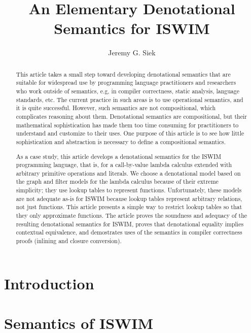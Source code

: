 \documentclass{article}
\title{An Elementary Denotational \\ Semantics for ISWIM}
\author{Jeremy G. Siek}
\begin{document}
\maketitle

\begin{abstract}
  This article takes a small step toward developing denotational
  semantics that are suitable for widespread use by programming
  language practitioners and researchers who work outside of
  semantics, e.g, in compiler correctness, static analysis, language
  standards, etc. The current practice in such areas is to use
  operational semantics, and it is quite successful. However, such
  semantics are not compositional, which complicates reasoning about
  them.  Denotational semantics are compositional, but their
  mathematical sophistication has made them too time consuming for
  practitioners to understand and customize to their uses. One purpose
  of this article is to see how little sophistication and abstraction
  is necessary to define a compositional semantics.

  As a case study, this article develops a denotational semantics for
  the ISWIM programming language, that is, for a call-by-value lambda
  calculus extended with arbitrary primitive operations and literals.
  We choose a denotational model based on the graph and filter models
  for the lambda calculus because of their extreme simplicity; they
  use lookup tables to represent functions. Unfortunately, these
  models are not adequate as-is for ISWIM because lookup tables
  represent arbitrary relations, not just functions. This article
  presents a simple way to restrict lookup tables so that they only
  approximate functions. The article proves the soundness and adequacy
  of the resulting denotational semantics for ISWIM, proves that
  denotational equality implies contextual equivalence, and
  demostrates uses of the semantics in compiler correctness proofs
  (inlining and closure conversion).
\end{abstract}


\section{Introduction}

\citet{Barendregt:2013aa}

\section{Semantics of ISWIM}
\end{document}
